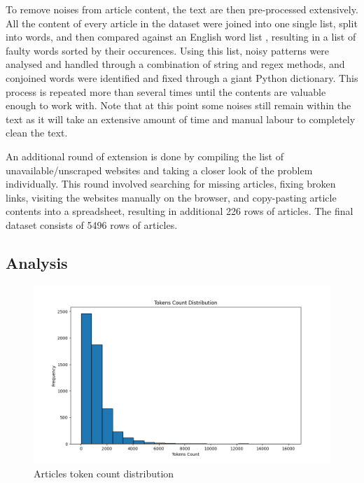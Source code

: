 To remove noises from article content, the text are then pre-processed extensively. All the content of every article in the dataset were joined into one single list, split into words, and then compared against an English word list \cite{dwyl-english-words}, resulting in a list of faulty words sorted by their occurences. Using this list, noisy patterns were analysed and handled through a combination of string and regex methods, and conjoined words were identified and fixed through a giant Python dictionary. This process is repeated more than several times until the contents are valuable enough to work with. Note that at this point some noises still remain within the text as it will take an extensive amount of time and manual labour to completely clean the text.

An additional round of extension is done by compiling the list of unavailable/unscraped websites and taking a closer look of the problem individually. This round involved searching for missing articles, fixing broken links, visiting the websites manually on the browser, and copy-pasting article contents into a spreadsheet, resulting in additional 226 rows of articles. The final dataset consists of 5496 rows of articles.

\subsection{Analysis}

\begin{figure}[htbp]
    \centering
    \includegraphics[width=0.9\linewidth]{figures/tokens_count_vx_hist.png}
    \caption{Articles token count distribution}
    \label{fig:tokens_hist}
\end{figure}

